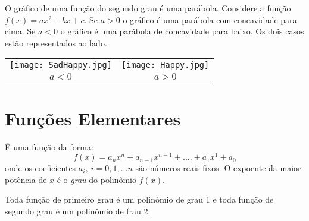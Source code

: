 \vspace{0.5cm}

\begin{multicols}{2}

O gráfico de uma função do segundo grau é uma parábola. Considere a função
$f(x)=ax^2+bx+c$. Se $a>0$ o gráfico é uma parábola com concavidade para cima. Se $a<0$ o gráfico é uma parábola de concavidade para baixo. Os dois casos estão representados ao lado.

\columnbreak

\vspace{1cm}

\begin{center}
\begin{tabular}{cc}
\texttt{[image: SadHappy.jpg]} & \texttt{[image: Happy.jpg]} \\
$a<0$ & $a>0$
\end{tabular}
\end{center}
\end{multicols}

\section{Funções Elementares}

\vspace{0.5cm}

  É uma função da forma:
\begin{equation}\label{polinomio}f(x)=a_nx^n+a_{n-1}x^{n-1}+....+a_1x^{1}+a_0\end{equation}
onde os coeficientes $a_i,\ i=0,1,...n$ são números reais fixos. O expoente da maior potência de $x$ é o {\it grau} do polinômio $f(x)$.

\begin{center}
\end{center}

\begin{ex} Toda função de primeiro grau é um polinômio de grau 1 e toda função de segundo grau é um polinômio de frau 2.
\end{ex}

